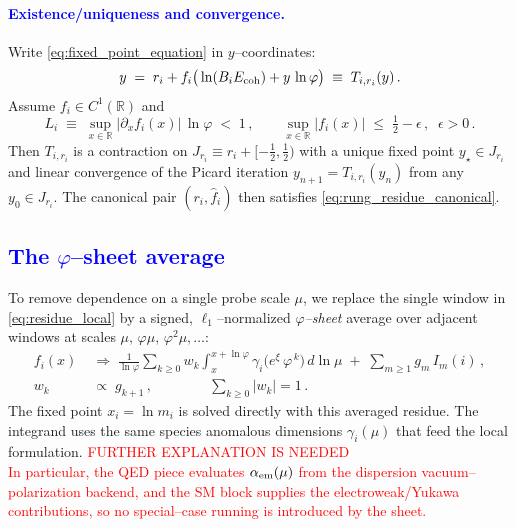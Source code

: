 \documentclass[%
 amsmath,amssymb,
 aps,
prb,
floatfix, showkeys
]{revtex4-2}
\newcommand{\need}[1]{\textcolor{red}{#1}}
\newcommand{\modif}[1]{\textcolor{blue}{#1}}
\begin{document}
\vspace{0.5cm}

\paragraph{  {\modif{ Existence/uniqueness and convergence.} }}
Write \eqref{eq:fixed_point_equation} in $y$–coordinates:
\[
  y \;=\; r_i + f_i\big(\ln(B_i E_{\rm coh}) + y\,\ln\varphi\big) \;\equiv\; T_{i,r_i}(y)\,.
\]
Assume $f_i\in C^1(\mathbb{R})$ and
\begin{equation}
  L_i \;\equiv\; \sup_{x\in\mathbb{R}} \bigl|\partial_x f_i(x)\bigr|\,\ln\varphi \;<\; 1\,,\qquad
  \sup_{x\in\mathbb{R}} |f_i(x)| \;\le\; \tfrac{1}{2} - \epsilon\,,\;\; \epsilon>0\,.
  \label{eq:contraction_conditions}
\end{equation}
Then $T_{i,r_i}$ is a contraction on $J_{r_i}\equiv r_i+[-\tfrac{1}{2},\tfrac{1}{2})$ with a unique
  fixed point $y_\star\in J_{r_i}$ and linear convergence of the Picard iteration
  $y_{n+1}=T_{i,r_i}(y_n)$ from any $y_0\in J_{r_i}$.
  The canonical pair $(r_i,\widehat f_i)$ then satisfies \eqref{eq:rung_residue_canonical}.





  
\subsection{ {\modif{ The $\varphi$--sheet average}   }}
\label{subsec:phi-sheet}
To remove dependence on a single probe scale $\mu$, we replace the single window
in \eqref{eq:residue_local} by a signed, $\ell_1$–normalized \emph{$\varphi$–sheet} average
over adjacent windows at scales $\mu,\,\varphi\mu,\,\varphi^2\mu,\dots$:
\begin{align}
  f_i(x)
  &\;\Rightarrow\; \frac{1}{\ln\varphi} \sum_{k\ge 0} w_k \int_{x}^{x+\ln\varphi}\!
     \gamma_i\!\big(e^{\xi}\,\varphi^{\,k}\big)\,d\ln\mu \;+\; \sum_{m\ge 1} g_m\,I_m(i)\,,
  \label{eq:sheet_residue}\\[2pt]
  w_k &\;\propto\; g_{k+1}\,,\qquad     %
  \qquad \sum_{k\ge 0} |w_k|=1\,.
\end{align}
The fixed point $x_i=\ln m_i$ is solved directly with this averaged residue.
The integrand uses the same species anomalous dimensions $\gamma_i(\mu)$ that feed the
local formulation.
{\need{ FURTHER EXPLANATION IS NEEDED \\
    In particular, the QED piece evaluates $\alpha_{\rm em}(\mu)$ from the dispersion
vacuum–polarization backend, and the SM block supplies the electroweak/Yukawa contributions,
so no special--case running is introduced by the sheet.
}}
\end{document}
